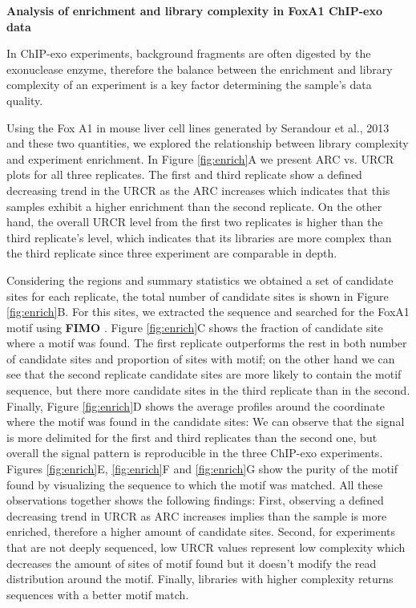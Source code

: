 \documentclass{bmcart}\usepackage[]{graphicx}\usepackage[]{color}
\begin{document}
\textbf{Analysis of enrichment and library complexity in FoxA1
  ChIP-exo data}

In ChIP-exo experiments, background fragments are often digested by
the exonuclease enzyme, therefore the balance between the enrichment
and library complexity of an experiment is a key factor determining
the sample's data quality.

Using the Fox A1 in mouse liver cell lines generated by Serandour et
al., 2013\nocite{exoillumina} and these two quantities, we explored
the relationship between library complexity and experiment
enrichment. In Figure \ref{fig:enrich}A we present ARC vs. URCR plots
for all three replicates. The first and third replicate show a defined
decreasing trend in the $\mbox{URCR}$ as the $\mbox{ARC}$ increases
which indicates that this samples exhibit a higher enrichment than the
second replicate. On the other hand, the overall $\mbox{URCR}$ level
from the first two replicates is higher than the third replicate's
level, which indicates that its libraries are more complex than the
third replicate since three experiment are comparable in depth.

Considering the regions and summary statistics we obtained a set of
candidate sites for each replicate, the total number of candidate
sites is shown in Figure \ref{fig:enrich}B. For this sites, we
extracted the sequence and searched for the FoxA1 motif using
\textbf{FIMO} \cite{fimo}. Figure \ref{fig:enrich}C shows the fraction
of candidate site where a motif was found. The first replicate
outperforms the rest in both number of candidate sites and proportion
of sites with motif; on the other hand we can see that the second
replicate candidate sites are more likely to contain the motif
sequence, but there more candidate sites in the third replicate than
in the second. Finally, Figure \ref{fig:enrich}D shows the average
profiles around the coordinate where the motif was found in the
candidate sites: We can observe that the signal is more delimited for
the first and third replicates than the second one, but overall the
signal pattern is reproducible in the three ChIP-exo
experiments. Figures \ref{fig:enrich}E, \ref{fig:enrich}F and
\ref{fig:enrich}G show the purity of the motif found by visualizing
the sequence to which the motif was matched. All these observations
together shows the following findings: First, observing a defined
decreasing trend in $\mbox{URCR}$ as $\mbox{ARC}$ increases implies
than the sample is more enriched, therefore a higher amount of
candidate sites. Second, for experiments that are not deeply
sequenced, low $\mbox{URCR}$ values represent low complexity which
decreases the amount of sites of motif found but it doesn't modify the
read distribution around the motif. Finally, libraries with higher
complexity returns sequences with a better motif match.
\end{document}
